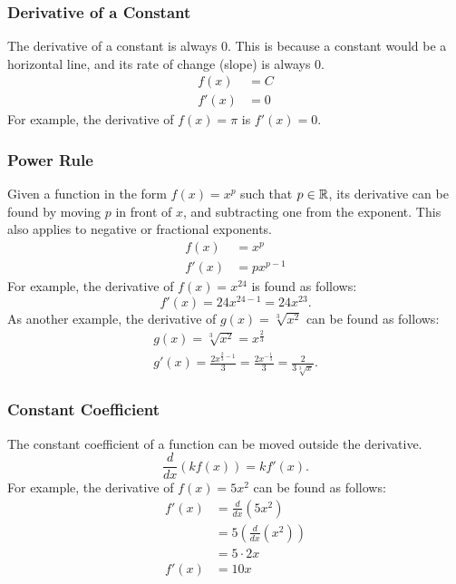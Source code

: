 \subsubsection{Derivative of a Constant}
The derivative of a constant is always $0$. This is because a constant would be a horizontal line, and its rate of change (slope) is always $0$.
\begin{align*}
	f(x) &= C \\
	f'(x) &= 0
\end{align*}
For example, the derivative of $f(x) = \pi$ is $f'(x) = 0$.

\subsubsection{Power Rule}
Given a function in the form $f(x) = x^p$ such that $p \in \mathbb{R}$, its derivative can be found by moving $p$ in front of $x$, and subtracting one from the exponent. This also applies to negative or fractional exponents.
\begin{align*}
	f(x) &= x^p \\
	f'(x) &= px^{p - 1}
\end{align*}
For example, the derivative of $f(x) = x^{24}$ is found as follows:
\[ f'(x) = 24 x^{24 - 1} = 24x^{23}. \]
As another example, the derivative of $g(x) = \sqrt[3]{x^2}$ can be found as follows:
\begin{gather*}
	g(x) = \sqrt[3]{x^2} = x^{\frac{2}{3}} \\
	g'(x) = \frac{2 x^{\frac{2}{3} - 1}}{3} = \frac{2 x^{-\frac{1}{3}}}{3} = \frac{2}{3 \sqrt[3]{x}}.
\end{gather*}

\subsubsection{Constant Coefficient}
The constant coefficient of a function can be moved outside the derivative.
\[ \frac{d}{dx} \left( k f(x) \right) = k f'(x). \]
For example, the derivative of $f(x) = 5x^2$ can be found as follows:
\begin{align*}
	f'(x) &= \frac{d}{dx} \left( 5x^2 \right) \\[5pt]
	&= 5 \left( \frac{d}{dx} \left( x^2 \right) \right) \\
	&= 5 \cdot 2x \\
	f'(x) &= 10x
\end{align*}

